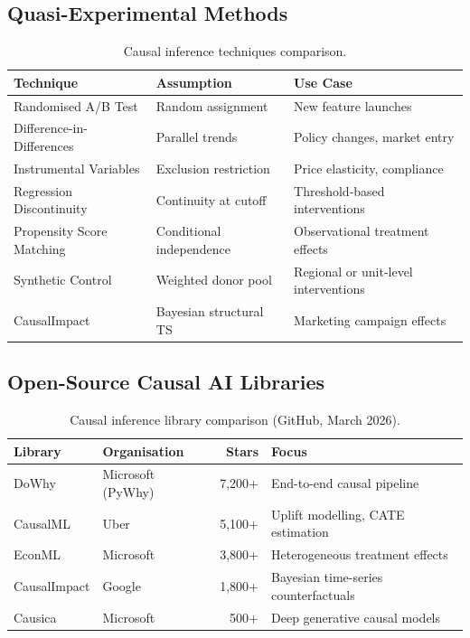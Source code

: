 \documentclass[12pt, a4paper]{article}
\begin{document}
\subsection{Quasi-Experimental Methods}

\begin{table}[ht]
\centering
\caption{Causal inference techniques comparison.}
\label{tab:causal-techniques}
\begin{tabular}{>{\raggedright\arraybackslash}p{4.2cm} >{\raggedright\arraybackslash}p{3.8cm} >{\raggedright\arraybackslash}p{5.5cm}}
\toprule
\textbf{Technique} & \textbf{Assumption} & \textbf{Use Case} \\
\midrule
Randomised A/B Test      & Random assignment          & New feature launches \\
Difference-in-Differences & Parallel trends           & Policy changes, market entry \\
Instrumental Variables    & Exclusion restriction      & Price elasticity, compliance \\
Regression Discontinuity  & Continuity at cutoff      & Threshold-based interventions \\
Propensity Score Matching & Conditional independence   & Observational treatment effects \\
Synthetic Control         & Weighted donor pool        & Regional or unit-level interventions \\
CausalImpact             & Bayesian structural TS     & Marketing campaign effects \\
\bottomrule
\end{tabular}
\end{table}

\subsection{Open-Source Causal AI Libraries}

\begin{table}[ht]
\centering
\caption{Causal inference library comparison (GitHub, March 2026).}
\label{tab:causal-tools}
\begin{tabular}{llrl}
\toprule
\textbf{Library} & \textbf{Organisation} & \textbf{Stars} & \textbf{Focus} \\
\midrule
DoWhy       & Microsoft (PyWhy) & 7,200+  & End-to-end causal pipeline \\
CausalML    & Uber              & 5,100+  & Uplift modelling, CATE estimation \\
EconML      & Microsoft         & 3,800+  & Heterogeneous treatment effects \\
CausalImpact & Google           & 1,800+  & Bayesian time-series counterfactuals \\
Causica     & Microsoft         & 500+    & Deep generative causal models \\
\bottomrule
\end{tabular}
\end{table}
\end{document}
